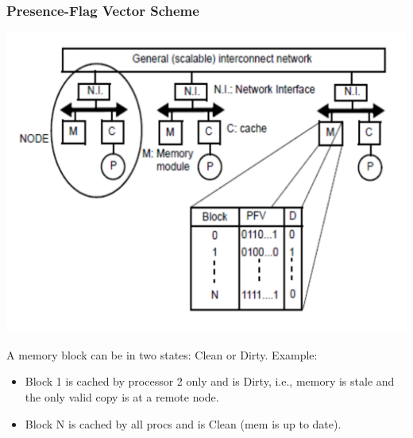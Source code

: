 \documentclass{beamer}
\renewcommand{\emph}[1]{\textcolor{structure}{#1}}
\newcommand{\emp}[1]{\textcolor{DikuRed}{ #1}}
\begin{document}
\begin{frame}[fragile,t]
\frametitle{Presence-Flag Vector Scheme}

\includegraphics[width=48ex]{Figures/FigsInfCoherence/PresenceFlag}
\vspace{-2ex}
\pause

A memory block can be in two states: Clean or Dirty. Example:
\begin{itemize}
    \item Block 1 is cached by processor 2 only and is \emp{Dirty},
            i.e., memory is stale and the only valid copy is at a remote node.
    \item Block N is cached by all procs and is \emph{Clean} (mem is up to date).
\end  {itemize}

\end{frame}
\end{document}

